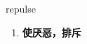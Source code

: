 
\begin{frame}
{\huge repulse}
\begin{center}
\begin{enumerate}\Large
  \item \textbf{使厌恶，排斥}
\end{enumerate}
\end{center}
\end{frame}
